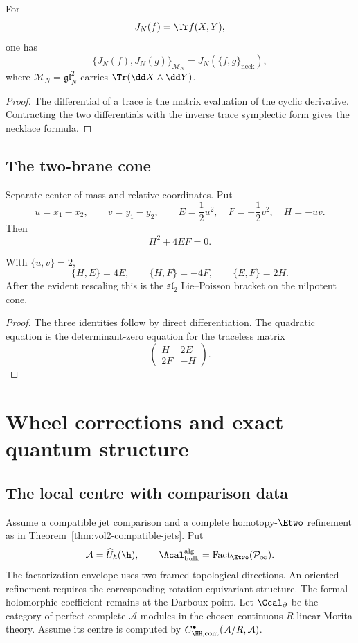 \begin{theorem}
For
\[
 J_N(f)=\Tr f(X,Y),
\]
one has
\[
 \{J_N(f),J_N(g)\}_{\mathcal M_N}
 =J_N\!\left(\{f,g\}_{\mathrm{neck}}\right),
\]
where $\mathcal M_N=\mathfrak{gl}_N^2$ carries $\Tr(\dd X\wedge\dd Y)$.
\end{theorem}
\begin{proof}
The differential of a trace is the matrix evaluation of the cyclic derivative.  Contracting the two differentials with the inverse trace symplectic form gives the necklace formula.
\end{proof}

\chapter{The two-brane cone}
Separate center-of-mass and relative coordinates.  Put
\[
 u=x_1-x_2,
 \qquad
 v=y_1-y_2,
 \qquad
 E=\frac12u^2,
 \quad
 F=-\frac12v^2,
 \quad
 H=-uv.
\]
Then
\[
 H^2+4EF=0.
\]

\begin{proposition}
With $\{u,v\}=2$,
\[
 \{H,E\}=4E,
 \qquad
 \{H,F\}=-4F,
 \qquad
 \{E,F\}=2H.
\]
After the evident rescaling this is the $\mathfrak{sl}_2$ Lie--Poisson bracket on the nilpotent cone.
\end{proposition}
\begin{proof}
The three identities follow by direct differentiation.  The quadratic equation is the determinant-zero equation for the traceless matrix
\[
 \begin{pmatrix}H&2E\\2F&-H\end{pmatrix}.
\]
\end{proof}

\part{Wheel corrections and exact quantum structure}

\chapter{The local centre with comparison data}
Assume a compatible jet comparison and a complete homotopy-$\Etwo$
refinement as in Theorem~\ref{thm:vol2-compatible-jets}.
Put
\[
 \mathcal A=\widehat U_\hbar(\h),\qquad
 \Acal_{\mathrm{bulk}}^{\mathrm{alg}}
 =\operatorname{Fact}_{\Etwo}(\mathcal P_\infty).
\]
The factorization envelope uses two framed topological directions.
An oriented refinement requires the corresponding rotation-equivariant structure.
The formal holomorphic coefficient remains at the Darboux point.
Let $\Ccal_\partial$ be the category of perfect complete $\mathcal A$-modules
in the chosen continuous $R$-linear Morita theory.
Assume its centre is computed by
$C^\bullet_{\HH,\mathrm{cont}}(\mathcal A/R,\mathcal A)$.

